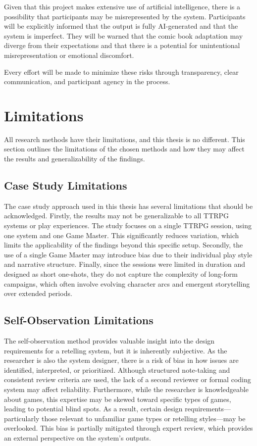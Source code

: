 Given that this project makes extensive use of artificial intelligence, there is a possibility that participants may be misrepresented by the system. Participants will be explicitly informed that the output is fully AI-generated and that the system is imperfect. They will be warned that the comic book adaptation may diverge from their expectations and that there is a potential for unintentional misrepresentation or emotional discomfort.

Every effort will be made to minimize these risks through transparency, clear communication, and participant agency in the process.

\section{Limitations}
All research methods have their limitations, and this thesis is no different. This section outlines the limitations of the chosen methods and how they may affect the results and generalizability of the findings.

\subsection*{Case Study Limitations}
The case study approach used in this thesis has several limitations that should be acknowledged. Firstly, the results may not be generalizable to all TTRPG systems or play experiences. The study focuses on a single TTRPG session, using one system and one Game Master. This significantly reduces variation, which limits the applicability of the findings beyond this specific setup. Secondly, the use of a single Game Master may introduce bias due to their individual play style and narrative structure. Finally, since the sessions were limited in duration and designed as short one-shots, they do not capture the complexity of long-form campaigns, which often involve evolving character arcs and emergent storytelling over extended periods.

\subsection*{Self-Observation Limitations}
The self-observation method provides valuable insight into the design requirements for a retelling system, but it is inherently subjective. As the researcher is also the system designer, there is a risk of bias in how issues are identified, interpreted, or prioritized. Although structured note-taking and consistent review criteria are used, the lack of a second reviewer or formal coding system may affect reliability. Furthermore, while the researcher is knowledgeable about games, this expertise may be skewed toward specific types of games, leading to potential blind spots. As a result, certain design requirements—particularly those relevant to unfamiliar game types or retelling styles—may be overlooked. This bias is partially mitigated through expert review, which provides an external perspective on the system's outputs.

